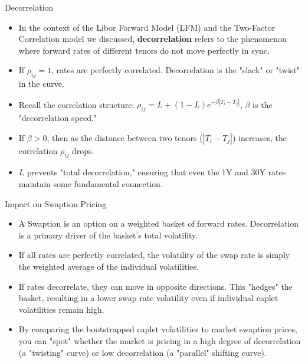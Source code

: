 \documentclass{beamer}
\begin{document}
\begin{frame}{Decorrelation}
	\begin{itemize}
		\item In the context of the Libor Forward Model (LFM) and the Two-Factor Correlation model we discussed, \textbf{decorrelation} refers to the phenomenon where forward rates of different tenors do not move perfectly in sync.
		\item If $\rho_{ij}=1$, rates are perfectly correlated. Decorrelation is the "slack" or "twist" in the curve.
		\item Recall the correlation structure: $\rho_{ij}=L+(1-L)e^{-\beta|T_i-T_j|}$, $\beta$ is the "decorrelation speed."
		\item If $\beta>0$, then as the distance between two tenors ($|T_i-T_j|$) increases, the correlation $\rho_{ij}$ drops.
		\item $L$ prevents "total decorrelation," ensuring that even the 1Y and 30Y rates maintain some fundamental connection.
	\end{itemize}
\end{frame}

\begin{frame}{Impact on Swaption Pricing}
	\begin{itemize}
		\item A Swaption is an option on a weighted basket of forward rates. Decorrelation is a primary driver of the basket's total volatility.
		\item If all rates are perfectly correlated, the volatility of the swap rate is simply the weighted average of the individual volatilities.
		\item If rates decorrelate, they can move in opposite directions. This "hedges" the basket, resulting in a lower swap rate volatility even if individual caplet volatilities remain high.
		\item By comparing the bootstrapped caplet volatilities to market swaption prices, you can "spot" whether the market is pricing in a high degree of decorrelation (a "twisting" curve) or low decorrelation (a "parallel" shifting curve).
	\end{itemize}
\end{frame}
\end{document}
